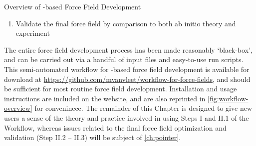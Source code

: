 \begin{section}{Overview of \sapt-based Force Field Development}
\begin{minipage}{\linewidth}
\begin{enumerate}[label=\Roman*)]
\begin{enumerate}[label=\arabic*)]
    force field functional form to the two-body benchmark energies from Step \ref{workflow:step1}
        (see \cref{ch:pointer})
    \label{step:workflow-dimers}
    \item Validate the final force field by comparison to both ab initio theory and experiment
    \end{enumerate}
\end{enumerate}
\phantom{abc}
\end{minipage}
%
The entire force field development
process has been made reasonably `black-box', and can be carried out via a
handful of input files and easy-to-use run scripts. This semi-automated workflow
for \sapt-based force field development is available for download 
at
\url{https://github.com/mvanvleet/workflow-for-force-fields}, and should be
sufficient for most routine force field development. Installation and
usage instructions are included on the website, and are also reprinted in
\cref{fig:workflow-overview} for conveninece. 
The remainder of this Chapter is designed to give new users a sense
of the
theory and practice involved in using Steps I and II.1 of the Workflow,
whereas issues related to the final force field optimization and validation
(Step II.2 -- II.3) will be subject of \cref{ch:pointer}.

\end{section}

